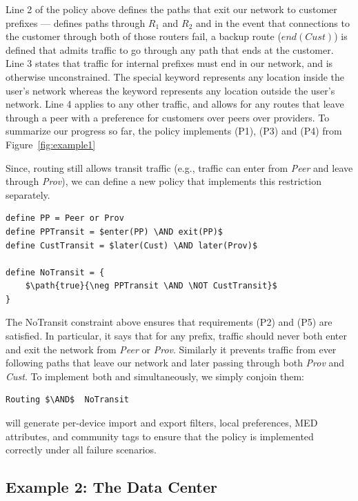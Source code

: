 Line 2 of the policy above
defines the paths that exit our network to customer prefixes ---
 defines paths through $R_1$ and $R_2$ and in the event
that connections to the customer through both of those routers fail,
a backup route ($end(Cust)$) is defined that admits traffic to go through
any path that ends at the customer.
Line 3 states that traffic for internal prefixes must end in our network, and is otherwise unconstrained.  The special keyword  represents any location
inside the user's network whereas the keyword  represents any location
outside the user's network.
Line 4 applies to any other traffic, and allows for any routes that leave through a peer with a preference for customers over peers over providers. To summarize our progress so far, the  policy
implements (P1), (P3) and (P4) from Figure~\ref{fig:example1}

Since, routing still allows transit traffic (e.g., traffic can enter from \textit{Peer} and leave through \textit{Prov}), we can define a new policy that
implements this restriction separately.

\begin{lstlisting}[mathescape=true]
define PP = Peer or Prov
define PPTransit = $enter(PP) \AND exit(PP)$
define CustTransit = $later(Cust) \AND later(Prov)$

define NoTransit = {
    $\path{true}{\neg PPTransit \AND \NOT CustTransit}$
}
\end{lstlisting}

The \textsf{NoTransit} constraint above ensures that requirements (P2) and (P5) are satisfied. In particular, it says that for any prefix, traffic should never both enter and exit the network from \textit{Peer} or \textit{Prov}. Similarly it prevents traffic from ever following paths that leave our network and later passing through both \textit{Prov} and \textit{Cust}.  To implement both 
and  simultaneously, we simply conjoin them:

\begin{lstlisting}[mathescape=true]
Routing $\AND$  NoTransit
\end{lstlisting}

\sysname will generate per-device import and export filters, local preferences,
MED attributes, and community tags to ensure that the policy is
implemented correctly under all failure scenarios.

\subsection{Example 2:  The Data Center}

